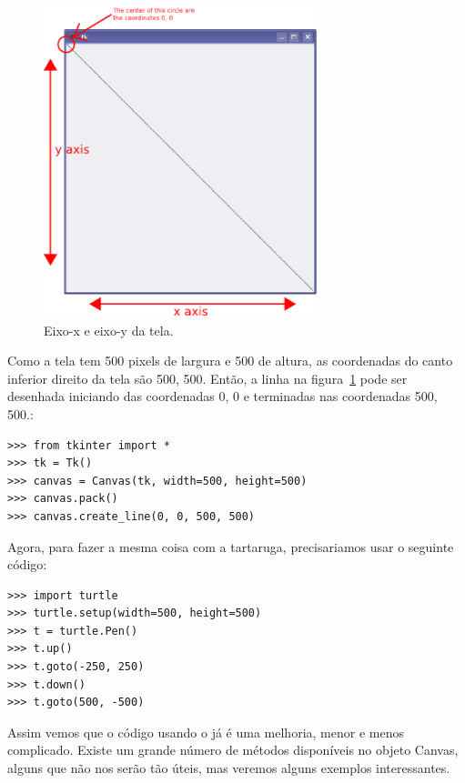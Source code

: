 \begin{figure}
\begin{center}
\includegraphics[width=80mm]{eps/figure32.eps}
\end{center}
\caption{Eixo-x e eixo-y da tela.}\label{fig32}
\end{figure}

Como a tela tem 500 pixels de largura e 500 de altura, as coordenadas do canto inferior direito da tela são 500, 500. Então, a linha na figura~\ref{fig32} pode ser desenhada iniciando das coordenadas 0, 0 e terminadas nas coordenadas 500, 500.:

\begin{listing}
\begin{verbatim}
>>> from tkinter import *
>>> tk = Tk()
>>> canvas = Canvas(tk, width=500, height=500)
>>> canvas.pack()
>>> canvas.create_line(0, 0, 500, 500)
\end{verbatim}
\end{listing}

\noindent
Agora, para fazer a mesma coisa com a tartaruga, precisariamos usar o seguinte código:

\begin{listing}
\begin{verbatim}
>>> import turtle
>>> turtle.setup(width=500, height=500)
>>> t = turtle.Pen()
>>> t.up()
>>> t.goto(-250, 250)
>>> t.down()
>>> t.goto(500, -500)
\end{verbatim}
\end{listing}

Assim vemos que o código usando o  já é uma melhoria, menor e menos complicado. Existe um grande número de métodos disponíveis no objeto Canvas, alguns que não nos serão tão úteis, mas veremos alguns exemplos interessantes.

